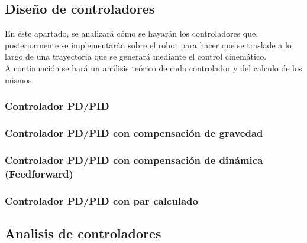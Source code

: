 	\subsection{Diseño de controladores}
	En éste apartado, se analizará cómo se hayarán los controladores que, posteriormente se implementarán sobre el robot para hacer que se traslade a lo largo de una trayectoria que se generará mediante el control cinemático.\\
	A continuación se hará un análisis teórico de cada controlador y del calculo de los mismos.
	\subsubsection{Controlador PD/PID}
	\subsubsection{Controlador PD/PID con compensación de gravedad}
	\subsubsection{Controlador PD/PID con compensación de dinámica (Feedforward)}
	\subsubsection{Controlador PD/PID con par calculado}
	\subsection{Analisis de controladores}